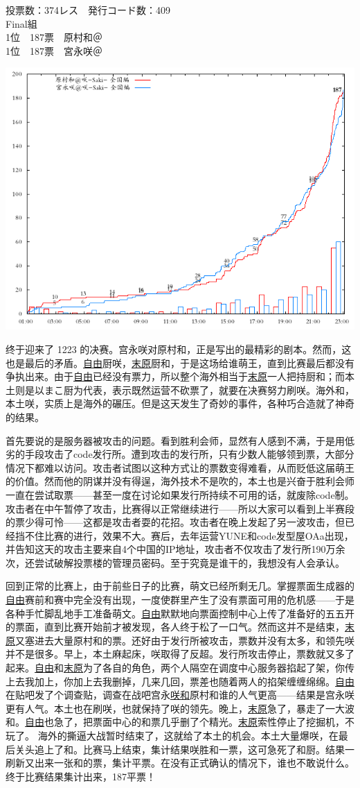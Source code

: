 \begin{minipage}[t]{.45\textwidth}\VoteFont
  投票数：374レス　発行コード数：409\\
  Final組\\
  1位　187票　原村和＠\Saki\\
  1位　187票　宮永咲＠\Saki
\end{minipage}

\includegraphics[width=.45\textwidth]{images/graph1223.png}

终于迎来了 1223 的决赛。宫永咲对原村和，正是写出的最精彩的剧本。然而，这也是最后的矛盾。\uline{自由}厨咲，\uline{末原}厨和，于是这场给谁萌王，直到比赛最后都没有争执出来。由于\uline{自由}已经没有票力，所以整个海外相当于\uline{末原}一人把持厨和；而本土则是以まこ厨为代表，表示既然运营不砍票了，就要在决赛努力刷咲。海外和，本土咲，实质上是海外的碾压。但是这天发生了奇妙的事件，各种巧合造就了神奇的结果。

首先要说的是服务器被攻击的问题。看到胜利会师，显然有人感到不满，于是用低劣的手段攻击了code发行所。遭到攻击的发行所，只有少数人能够领到票，大部分情况下都难以访问。攻击者试图以这种方式让的票数变得难看，从而贬低这届萌王的价值。然而他的阴谋并没有得逞，海外技术不是吹的，本土也是兴奋于胜利会师一直在尝试取票——甚至一度在讨论如果发行所持续不可用的话，就废除code制。攻击者在中午暂停了攻击，比赛得以正常继续进行——所以大家可以看到上半赛段的票少得可怜——这都是攻击者耍的花招。攻击者在晚上发起了另一波攻击，但已经挡不住比赛的进行，效果不大。赛后，去年运营YUNE和code发型屋OAa出现，并告知这天的攻击主要来自4个中国的IP地址，攻击者不仅攻击了发行所190万余次，还尝试破解投票楼的管理员密码。至于究竟是谁干的，我想没有人会承认。

回到正常的比赛上，由于前些日子的比赛，萌文已经所剩无几。掌握票面生成器的\uline{自由}赛前和赛中完全没有出现，一度使群里产生了没有票面可用的危机感——于是各种手忙脚乱地手工准备萌文。\uline{自由}默默地向票面控制中心上传了准备好的五五开的票面，直到比赛开始前才被发现，各人终于松了一口气。然而这并不是结束，\uline{末原}又塞进去大量原村和的票。还好由于发行所被攻击，票数并没有太多，和领先咲并不是很多。早上，本土麻起床，咲取得了反超。发行所攻击停止，票数就又多了起来。\uline{自由}和\uline{末原}为了各自的角色，两个人隔空在调度中心服务器掐起了架，你传上去我加上，你加上去我删掉，几来几回，票差也随着两人的掐架缠缠绵绵。\uline{自由}在贴吧发了个调查贴，调查在战吧宫永\uline{咲}\uline{和}原村和谁的人气更高——结果是宫永咲更有人气。本土也在刷咲，也就保持了咲的领先。晚上，\uline{末原}急了，暴走了一大波和。\uline{自由}也急了，把票面中心的和票几乎删了个精光。\uline{末原}索性停止了挖掘机，不玩了。
海外的撕逼大战暂时结束了，这就给了本土的机会。本土大量爆咲，在最后关头追上了和。比赛马上结束，集计结果咲胜和一票，这可急死了和厨。结果一刷新又出来一张和的票，集计平票。在没有正式确认的情况下，谁也不敢说什么。终于比赛结果集计出来，187平票！

